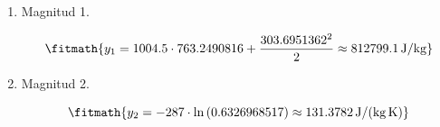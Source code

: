 \begin{enumerate}

\item Magnitud 1.

\[\fitmath{y_{1}=1004.5\cdot 763.2490816+\frac{{303.6951362}^{2}}{2}\approx 812799.1\,\mathrm{J/kg}}\]

\item Magnitud 2.

\[\fitmath{y_{2}=-287\cdot \ln\left(0.6326968517\right)\approx 131.3782\,\mathrm{J/(kg\,K)}}\]

\end{enumerate}
